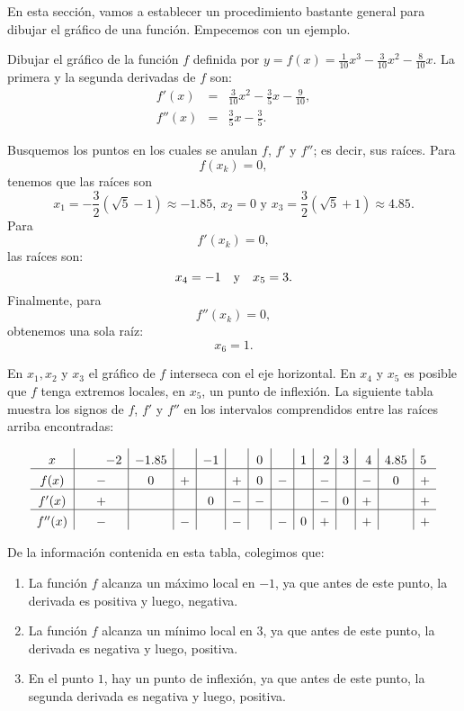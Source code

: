 En esta sección, vamos a establecer un procedimiento bastante general para dibujar el gráfico de
una función. Empecemos con un ejemplo.

\begin{exemplo}[Solución]{%
Dibujar el gráfico de la función $f$ definida por $y=f(x)=
\frac{1}{10}x^{3}-\frac{3}{10}x^{2}-\frac{8}{10}x$.
}%
La primera y la segunda derivadas de $f$ son:
\begin{eqnarray*}
  f'(x) &=& \frac{3}{10}x^{2}-\frac{3}{5}x-\frac{9}{10}, \\
  f''(x) &=& \frac{3}{5}x-\frac{3}{5}.
\end{eqnarray*}

Busquemos los puntos en los cuales se anulan $f$, $f'$ y $f''$; es decir, sus raíces. Para
\begin{equation*}
f(x_{k})=0,
\end{equation*}
tenemos que las raíces son
\[
x_{1}=-\frac{3}{2}(\sqrt{5}-1)\approx -1.85,\  x_{2}=0 \text{ y }
x_{3}=\frac{3}{2}(\sqrt{5}+1)\approx 4.85.
\]
Para
\begin{equation*}
	f'(x_{k})=0,
\end{equation*}
las raíces son:
\[
x_{4}=-1 \quad\text{y}\quad  x_{5}=3.
\]
Finalmente, para
\begin{equation*}
	f''(x_{k})=0,
\end{equation*}
obtenemos una sola raíz:
\[
x_{6}=1.
\]

En $x_{1},x_{2}$ y $x_{3}$ el gráfico de $f$ interseca con el eje horizontal. En $x_{4}$ y $x_{5}$
es posible que $f$ tenga extremos locales,  en $x_{5}$, un punto de inflexión. La siguiente tabla
muestra los signos de  $f$, $f'$ y $f''$ en los intervalos comprendidos entre las raíces arriba
encontradas:

\[
\setlength\extrarowheight{4pt}
\begin{array}{c|c|c|c|c|c|c|c|c|c|c|c|c|c}
x & \multicolumn{1}{r|}{\hspace*{2em} -2} & -1.85 & & -1 & & 0 & & 1 &
\multicolumn{1}{r|}{2} & 3 & \multicolumn{1}{r|}{4} & \multicolumn{1}{r|}{4.85} &
\multicolumn{1}{l}{5} \\ \hline
f(x) & - & 0 & + & & + & 0 & - & & - & & - & 0 & + \\ \hline
f'(x) & + & & & 0 & - & - & & & - & 0 & + & & + \\ \hline
f''(x) & - & & - & & - & & - & 0 & + & & + & & +
\end{array}
\]

De la información contenida en esta tabla, colegimos que:
\begin{enumerate}
\item La función $f$ alcanza un máximo local en $-1$, ya que antes de este punto, la derivada
    es positiva y luego, negativa.
\item La función $f$ alcanza un mínimo local en $3$, ya que antes de este punto, la derivada es
    negativa y luego, positiva.
\item En el punto $1$, hay un punto de inflexión, ya que antes de este punto, la segunda
    derivada es negativa y luego, positiva.
\end{enumerate}


\end{exemplo}
